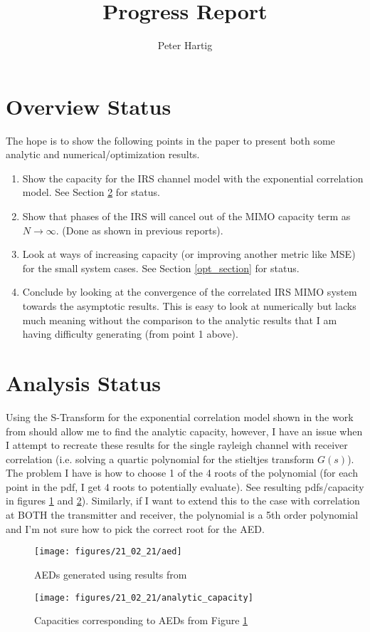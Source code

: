 \documentclass[12pt,a4paper]{article}
\title{Progress Report}
\author{Peter Hartig}
\begin{document}
\maketitle
\tableofcontents

\section{Overview Status}\label{overview}
The hope is to show the following points in the paper to present both some analytic and numerical/optimization results.
\begin{enumerate}
\item \label{analysis_point}
Show the capacity for the IRS channel model with the exponential correlation model. See Section \ref{analysis_section} for status.
\item
Show that phases of the IRS will cancel out of the MIMO capacity term as $N \rightarrow \infty	$. (Done as shown in previous reports).
\item 
Look at ways of increasing capacity (or improving another metric like MSE) for the small system cases.
See Section \ref{opt_section} for status.
\item 
Conclude by looking at the convergence of the correlated IRS MIMO system towards the asymptotic results. This is easy to look at numerically but lacks much meaning without the comparison to the analytic results that I am having difficulty generating (from point 1 above).
\end{enumerate}
\section{Analysis Status}\label{analysis_section}
Using the S-Transform for the exponential correlation model shown in the work from \cite{skupch2005free} should allow me to find the analytic capacity, however, I have an issue when I attempt to recreate these results for the single rayleigh channel with receiver correlation (i.e. solving a quartic polynomial for the stieltjes transform $G(s)$). The problem I have is how to choose 1 of the 4 roots of the polynomial (for each point in the pdf, I get 4 roots to potentially evaluate). See resulting pdfs/capacity in figures \ref{AED} and \ref{capacity}). Similarly, if I want to extend this to the case with correlation at BOTH the transmitter and receiver, the polynomial is a 5th order polynomial and I'm not sure how to pick the correct root for the AED.

	\begin{figure}[H]
	\texttt{[image: figures/21\_02\_21/aed]}
	  \caption{AEDs generated using results from \cite{skupch2005free} }
	  \label{AED}
	\end{figure}
		\begin{figure}[H]
	\texttt{[image: figures/21\_02\_21/analytic\_capacity]}
	  \caption{Capacities corresponding to AEDs from Figure \ref{AED}}
	  \label{capacity}
	\end{figure}
\end{document}
